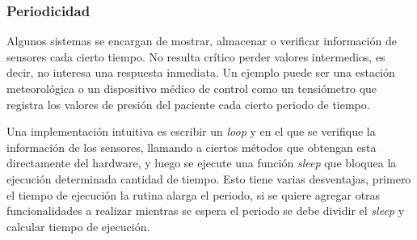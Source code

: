 \begin{figure}[H]
\begin{center}
{
}
\end{center}
\end{figure}


\subsubsection*{Periodicidad}

Algunos sistemas se encargan de mostrar, almacenar o verificar información de sensores cada cierto tiempo. No resulta crítico perder valores intermedios, es decir, no interesa una respuesta inmediata. Un ejemplo puede ser una estación meteorológica o un dispositivo médico de control como un tensiómetro que registra los valores de presión del paciente cada cierto periodo de tiempo.

Una implementación intuitiva es escribir un \textit{loop} y en el que se verifique la información de los sensores, llamando a ciertos métodos que obtengan esta directamente del hardware, y luego se ejecute una función \textit{sleep} que bloquea la ejecución determinada cantidad de tiempo. Esto tiene varias desventajas, primero el tiempo de ejecución la rutina alarga el periodo, si se quiere agregar otras funcionalidades a realizar mientras se espera el periodo se debe dividir el \textit{sleep} y calcular tiempo de ejecución.

